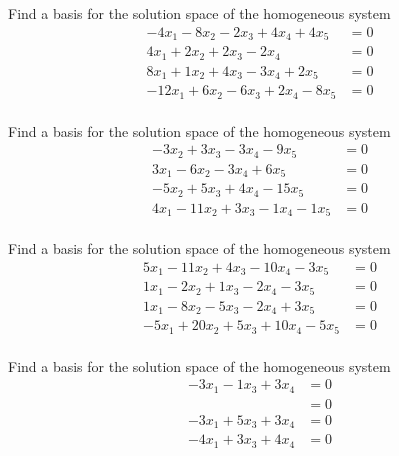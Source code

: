 \documentclass{article}
\begin{document}
\begin{exerciseStatement}
    Find a basis for the solution space of the homogeneous system
\begin{align*}
 -4 x_ 1 -8 x_ 2 -2 x_ 3 + 4 x_ 4 + 4 x_ 5 &= 0  \\
  4 x_ 1 + 2 x_ 2 + 2 x_ 3 -2 x_ 4 &= 0  \\
  8 x_ 1 + 1 x_ 2 + 4 x_ 3 -3 x_ 4 + 2 x_ 5 &= 0  \\
  -12 x_ 1 + 6 x_ 2 -6 x_ 3 + 2 x_ 4 -8 x_ 5 &= 0  \\
 \end{align*}



  
\end{exerciseStatement}

\begin{exerciseStatement}
    Find a basis for the solution space of the homogeneous system
\begin{align*}
 -3 x_ 2 + 3 x_ 3 -3 x_ 4 -9 x_ 5 &= 0  \\
  3 x_ 1 -6 x_ 2 -3 x_ 4 + 6 x_ 5 &= 0  \\
  -5 x_ 2 + 5 x_ 3 + 4 x_ 4 -15 x_ 5 &= 0  \\
  4 x_ 1 -11 x_ 2 + 3 x_ 3 -1 x_ 4 -1 x_ 5 &= 0  \\
 \end{align*}



  
\end{exerciseStatement}

\begin{exerciseStatement}
    Find a basis for the solution space of the homogeneous system
\begin{align*}
 5 x_ 1 -11 x_ 2 + 4 x_ 3 -10 x_ 4 -3 x_ 5 &= 0  \\
  1 x_ 1 -2 x_ 2 + 1 x_ 3 -2 x_ 4 -3 x_ 5 &= 0  \\
  1 x_ 1 -8 x_ 2 -5 x_ 3 -2 x_ 4 + 3 x_ 5 &= 0  \\
  -5 x_ 1 + 20 x_ 2 + 5 x_ 3 + 10 x_ 4 -5 x_ 5 &= 0  \\
 \end{align*}



  
\end{exerciseStatement}

\begin{exerciseStatement}
    Find a basis for the solution space of the homogeneous system
\begin{align*}
 -3 x_ 1 -1 x_ 3 + 3 x_ 4 &= 0  \\
  &= 0  \\
  -3 x_ 1 + 5 x_ 3 + 3 x_ 4 &= 0  \\
  -4 x_ 1 + 3 x_ 3 + 4 x_ 4 &= 0  \\
 \end{align*}



  
\end{exerciseStatement}
\end{document}
